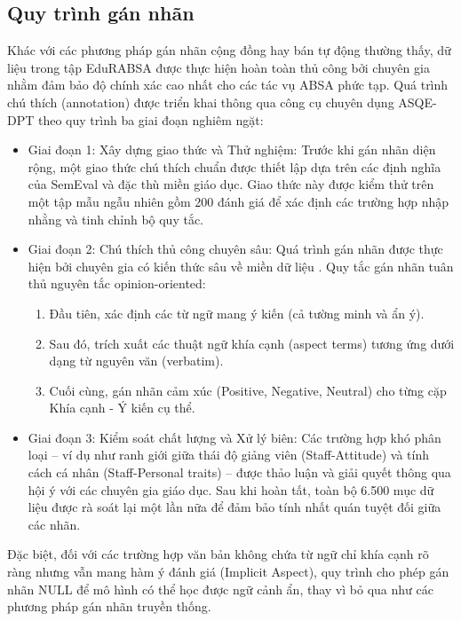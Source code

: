 \documentclass[12pt,a4paper]{report}
\begin{document}
\subsection{Quy trình gán nhãn}
Khác với các phương pháp gán nhãn cộng đồng hay bán tự động thường thấy, dữ liệu trong tập EduRABSA được thực hiện hoàn toàn thủ công bởi chuyên gia nhằm đảm bảo độ chính xác cao nhất cho các tác vụ ABSA phức tạp. Quá trình chú thích (annotation) được triển khai thông qua công cụ chuyên dụng ASQE-DPT theo quy trình ba giai đoạn nghiêm ngặt:

\begin{itemize}
    \item Giai đoạn 1: Xây dựng giao thức và Thử nghiệm: Trước khi gán nhãn diện rộng, một giao thức chú thích chuẩn được thiết lập dựa trên các định nghĩa của SemEval và đặc thù miền giáo dục. Giao thức này được kiểm thử trên một tập mẫu ngẫu nhiên gồm 200 đánh giá để xác định các trường hợp nhập nhằng và tinh chỉnh bộ quy tắc.
    \item Giai đoạn 2: Chú thích thủ công chuyên sâu: Quá trình gán nhãn được thực hiện bởi chuyên gia có kiến thức sâu về miền dữ liệu . Quy tắc gán nhãn tuân thủ nguyên tắc opinion-oriented:
    \begin{enumerate}
        \item Đầu tiên, xác định các từ ngữ mang ý kiến (cả tường minh và ẩn ý).
        \item Sau đó, trích xuất các thuật ngữ khía cạnh (aspect terms) tương ứng dưới dạng từ nguyên văn (verbatim).
        \item Cuối cùng, gán nhãn cảm xúc (Positive, Negative, Neutral) cho từng cặp Khía cạnh - Ý kiến cụ thể.
    
    \end{enumerate}
    \item Giai đoạn 3: Kiểm soát chất lượng và Xử lý biên: Các trường hợp khó phân loại – ví dụ như ranh giới giữa thái độ giảng viên (Staff-Attitude) và tính cách cá nhân (Staff-Personal traits) – được thảo luận và giải quyết thông qua hội ý với các chuyên gia giáo dục. Sau khi hoàn tất, toàn bộ 6.500 mục dữ liệu được rà soát lại một lần nữa để đảm bảo tính nhất quán tuyệt đối giữa các nhãn.
    
\end{itemize}
Đặc biệt, đối với các trường hợp văn bản không chứa từ ngữ chỉ khía cạnh rõ ràng nhưng vẫn mang hàm ý đánh giá (Implicit Aspect), quy trình cho phép gán nhãn NULL để mô hình có thể học được ngữ cảnh ẩn, thay vì bỏ qua như các phương pháp gán nhãn truyền thống.
\end{document}
